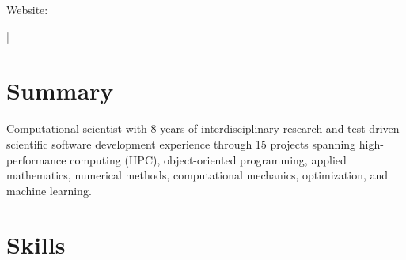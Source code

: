 \documentclass[letterpaper,10pt]{article}
\begin{document}
{\scshape\huge\Author}\vspace{2pt}

\begin{small}
  Website: \href{\AuthorWebsiteLink}{\AuthorWebsiteText}

  \vspace{2pt}\AuthorAddress

  \vspace{1pt}\href{mailto:\AuthorEmail}{\AuthorEmail} |
  \href{\AuthorPhoneLink}{\AuthorPhoneText}
\end{small}

\section{Summary}
Computational scientist with 8 years of interdisciplinary research and
test-driven scientific software development experience through 15\smallplus{}
projects spanning high-performance computing (HPC), object-oriented programming,
applied mathematics, numerical methods, computational mechanics, optimization,
and machine learning.

\section{Skills}
  \resumeSubHeadingListStart

      \resumeItemListStart

\end{document}
